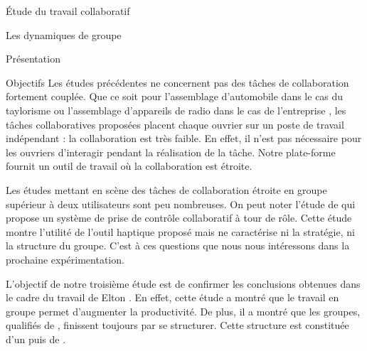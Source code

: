 \documentclass[myfrancais]{mythesis}
\begin{document}
\begin{mypart}{Étude du travail collaboratif}
\begin{mychapter}{Les dynamiques de groupe}
\begin{mysection}{Présentation}
\begin{mysubsection}{Objectifs}
					Les études précédentes ne concernent pas des tâches de collaboration fortement couplée.
					Que ce soit pour l'assemblage d'automobile dans le cas du taylorisme ou l'assemblage d'appareils de radio dans le cas de l'entreprise \myHawthorne, les tâches collaboratives proposées placent chaque ouvrier sur un poste de travail indépendant : la collaboration est très faible.
					En effet, il n'est pas nécessaire pour les ouvriers d'interagir pendant la réalisation de la tâche.
					Notre plate-forme fournit un outil de travail où la collaboration est étroite.

					Les études mettant en scène des tâches de collaboration étroite en groupe supérieur à deux utilisateurs sont peu nombreuses.
					On peut noter l'étude de  qui propose un système de prise de contrôle collaboratif à tour de rôle.
					Cette étude montre l'utilité de l'outil haptique proposé mais ne caractérise ni la stratégie, ni la structure du groupe.
					C'est à ces questions que nous nous intéressons dans la prochaine expérimentation.

					L'objectif de notre troisième étude est de confirmer les conclusions obtenues dans le cadre du travail de Elton .
					En effet, cette étude a montré que le travail en groupe permet d'augmenter la productivité.
					De plus, il a montré que les groupes, qualifiés de , finissent toujours par se structurer.
					Cette structure est constituée d'un  puis de .


\end{mysubsection}
\end{mysection}
\end{mychapter}
\end{mypart}
\end{document}
